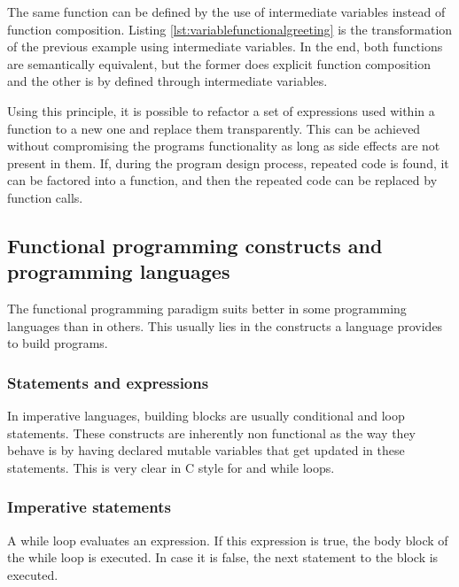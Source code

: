 \documentclass[../main.tex]{subfiles}
\begin{document}


The same function can be defined by the use of intermediate variables instead of
function composition. Listing \ref{lst:variablefunctionalgreeting} is the
transformation of the previous example using intermediate variables. In the end,
both functions are semantically equivalent, but the former does explicit
function composition and the other is by defined through intermediate variables.



Using this principle, it is possible to refactor a set of expressions used within
a function to a new one and replace them transparently. This can be achieved
without compromising the programs functionality as long as side effects are not
present in them. If, during the program design process, repeated code is found,
it can be factored into a function, and then the repeated code can be replaced by 
function calls.

\subsection{Functional programming constructs and programming languages} The
functional programming paradigm suits better in some programming languages than
in others. This usually lies in the constructs a language provides to build
programs.

\subsubsection{Statements and expressions} In imperative languages, building
blocks are usually conditional and loop statements. These constructs are
inherently non functional as the way they behave is by having declared mutable variables
that get updated in these statements. This is very clear in C style for and
while loops.

\subsubsection{Imperative statements} A while loop evaluates an expression. If
this expression is true, the body block of the while loop is executed. In case it is
false, the next statement to the block is executed.
\end{document}
